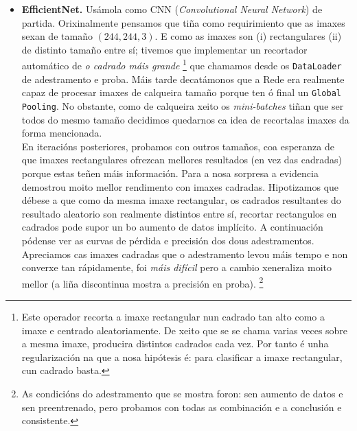 \documentclass{article}
\begin{document}
\begin{itemize}
	\item  \textbf{EfficientNet.} \cite{tan2019efficientnet} Usámola como CNN (\emph{Convolutional Neural Network}) de partida. Orixinalmente pensamos que tiña como requirimiento que as imaxes sexan de tamaño $(244,244,3)$. E como as imaxes son (i) rectangulares (ii) de distinto tamaño entre sí; tivemos que implementar un recortador automático de \emph{o cadrado máis grande} \footnote{Este operador recorta a imaxe rectangular nun cadrado tan alto como a imaxe e centrado aleatoriamente. De xeito que se se chama varias veces sobre a mesma imaxe, producira distintos cadrados cada vez. Por tanto é unha regularización na que a nosa hipótesis é: para clasificar a imaxe rectangular, cun cadrado basta.} que chamamos desde os \texttt{DataLoader} de adestramento e proba. Máis tarde decatámonos que a Rede era realmente capaz de procesar imaxes de calqueira tamaño porque ten ó final un \texttt{Global Pooling}. No obstante, como de calqueira xeito os \emph{mini-batches} tiñan que ser todos do mesmo tamaño decidimos quedarnos ca idea de recortalas imaxes da forma mencionada. \\

En iteracións posteriores, probamos con outros tamaños, coa esperanza de que imaxes rectangulares ofrezcan mellores resultados (en vez das cadradas) porque estas teñen máis información. Para a nosa sorpresa a evidencia demostrou moito mellor rendimento con imaxes cadradas. Hipotizamos que débese a que como da mesma imaxe rectangular, os cadrados resultantes do resultado aleatorio son realmente distintos entre sí, recortar rectangulos en cadrados pode supor un bo aumento de datos implícito. A continuación pódense ver as curvas de pérdida e precisión dos dous adestramentos. Apreciamos cas imaxes cadradas que o adestramento levou máis tempo e non converxe tan rápidamente, foi \emph{máis difícil} pero a cambio xeneraliza moito mellor (a liña discontinua mostra a precisión en proba). \footnote{As condicións do adestramento que se mostra foron: sen aumento de datos e sen preentrenado, pero probamos con todas as combinación e a conclusión e consistente.}\\




\end{itemize}
\end{document}
